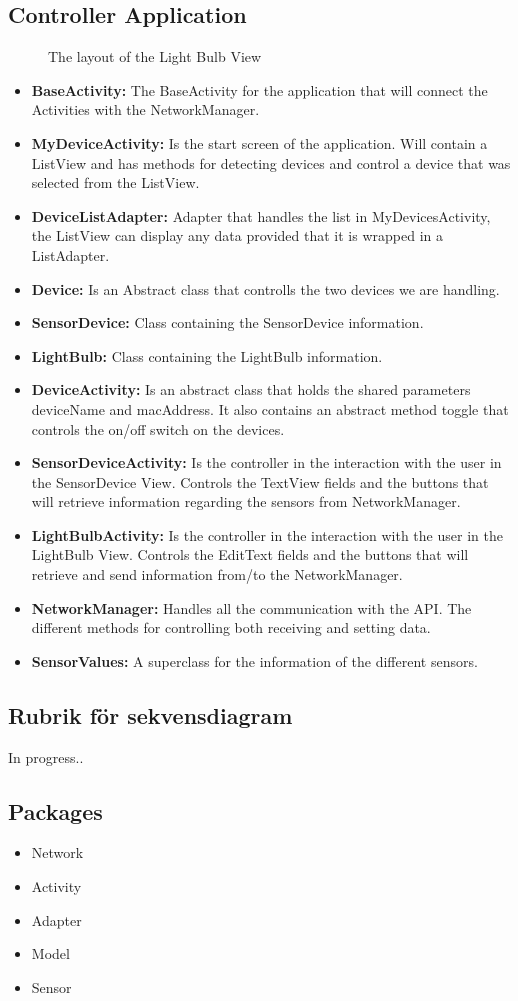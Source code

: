\documentclass[a4paper]{article}
\begin{document}
	\subsection{Controller Application}
	\begin{figure}[H]
		\centering
		\caption{The layout of the Light Bulb View}
		\label{fig:mylightbulbview}
	\end{figure}
	\begin{itemize}
		\item{\textbf{BaseActivity:}} 
		The BaseActivity for the application that will connect the Activities with the NetworkManager.
		\item{\textbf{MyDeviceActivity:}} 
		Is the start screen of the application. Will contain a ListView and has methods for detecting devices and control a device that was selected from the ListView.
		\item{\textbf{DeviceListAdapter:}} 
		Adapter that handles the list in MyDevicesActivity, the ListView can display any data provided that it is wrapped in a ListAdapter. 
		\item{\textbf{Device:}} 
		Is an Abstract class that controlls the two devices we are handling. 
		\item{\textbf{SensorDevice:}} 
		Class containing the SensorDevice information.
		\item{\textbf{LightBulb:}}
		Class containing the LightBulb information.
		\item{\textbf{DeviceActivity:}} 
		Is an abstract class that holds the shared parameters deviceName and macAddress. It also contains an abstract method toggle that controls the on/off switch on the devices.
		\item{\textbf{SensorDeviceActivity:}} 
		Is the controller in the interaction with the user in the SensorDevice View. Controls the TextView fields and the buttons that will retrieve information regarding the sensors from NetworkManager.
		\item{\textbf{LightBulbActivity:}} 
		Is the controller in the interaction with the user in the LightBulb View. Controls the EditText fields and the buttons that will retrieve and send information from/to the NetworkManager.
		
		\item{\textbf{NetworkManager:}} 
		Handles all the communication with the API. The different methods for controlling both receiving and setting data.
		\item{\textbf{SensorValues:}} 
		A superclass for the information of the different sensors.
		
	\end{itemize}
	
	\subsection{Rubrik för sekvensdiagram}
	In progress..
	\subsection{Packages}
	\begin{itemize}
		\item Network
		\item Activity
		\item Adapter
		\item Model
		\item Sensor
	\end{itemize}
	
\end{document}
